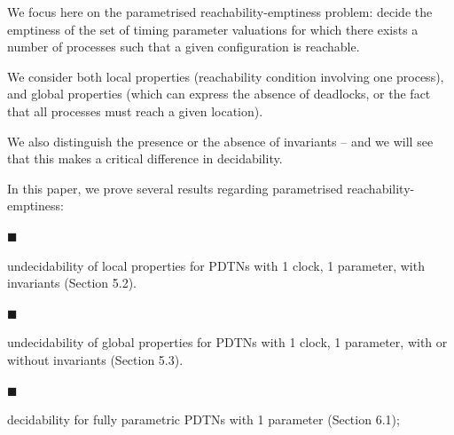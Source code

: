  
We focus here on the parametrised reachability-emptiness problem: decide the emptiness of the set of timing parameter valuations for which there exists a number of processes such that a given configuration is reachable.\par
 
 
 
We consider both local properties (reachability condition involving one process), and global properties (which can express the absence of deadlocks, or the fact that all processes must reach a given location).\par
 
 
 
We also distinguish the presence or the absence of invariants -- and we will see that this makes a critical difference in decidability.\par
 
 
 
In this paper, we prove several results regarding parametrised reachability-emptiness:\par
  
\par\noindent  $\blacksquare$ 
 
undecidability of local properties for PDTNs with 1 clock, 1 parameter, with invariants (Section 5.2).\par
 
 
 
\par\noindent  $\blacksquare$ 
 
undecidability of global properties for PDTNs with 1 clock, 1 parameter, with or without invariants (Section 5.3).\par
 
 
 
\par\noindent  $\blacksquare$ 
 
decidability for fully parametric PDTNs with 1 parameter (Section 6.1);\par
 
 
